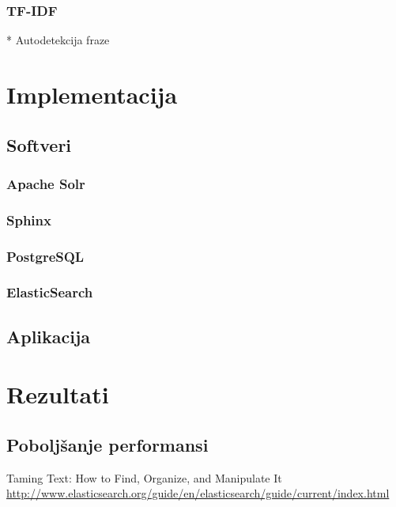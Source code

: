 \documentclass[11pt]{scrreprt}
\begin{document}
\subsection{TF-IDF} \label{tfidf}

* Autodetekcija fraze

\chapter{Implementacija}

\section{Softveri}

\subsection{Apache Solr}

\subsection{Sphinx}

\subsection{PostgreSQL}

\subsection{ElasticSearch}

\section{Aplikacija}

\chapter{Rezultati}

\section{Poboljšanje performansi}

\begin{thebibliography}{99}
   Taming Text: How to Find, Organize, and Manipulate It
   \url{http://www.elasticsearch.org/guide/en/elasticsearch/guide/current/index.html}
\end{thebibliography}
\end{document}
